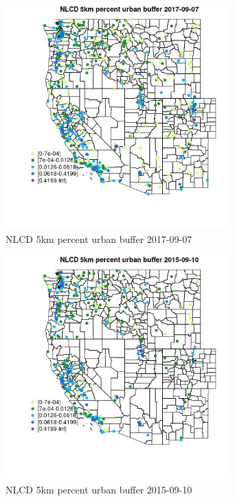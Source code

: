 \begin{figure} 
\centering  
\includegraphics[width=0.77\textwidth]{Code_Outputs/Report_ML_input_PM25_Step4_part_e_de_duplicated_aves_compiled_2019-05-20wNAs_MapObsNLCD_5km_percent_urban_buffer2017-09-07.jpg} 
\caption{\label{fig:Report_ML_input_PM25_Step4_part_e_de_duplicated_aves_compiled_2019-05-20wNAsMapObsNLCD_5km_percent_urban_buffer2017-09-07}NLCD 5km percent urban buffer 2017-09-07} 
\end{figure} 
 

\clearpage 

\begin{figure} 
\centering  
\includegraphics[width=0.77\textwidth]{Code_Outputs/Report_ML_input_PM25_Step4_part_e_de_duplicated_aves_compiled_2019-05-20wNAs_MapObsNLCD_5km_percent_urban_buffer2015-09-10.jpg} 
\caption{\label{fig:Report_ML_input_PM25_Step4_part_e_de_duplicated_aves_compiled_2019-05-20wNAsMapObsNLCD_5km_percent_urban_buffer2015-09-10}NLCD 5km percent urban buffer 2015-09-10} 
\end{figure} 
 

